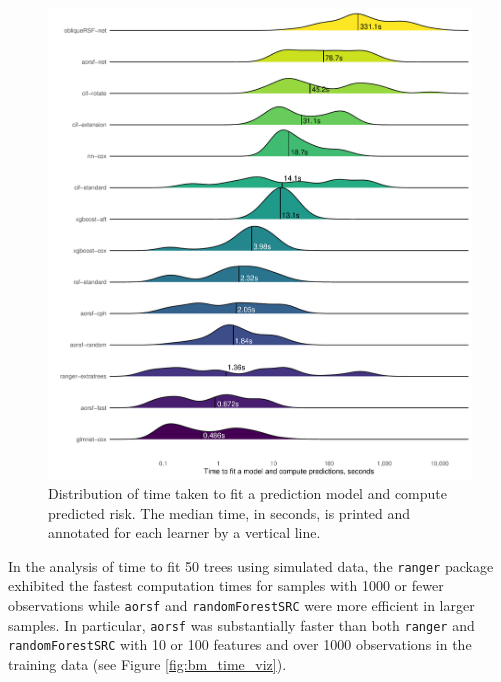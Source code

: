 \documentclass[twoside,11pt]{article}\usepackage[]{graphicx}\usepackage[]{xcolor}
\makeatletter
\def\maxwidth{ %
  \ifdim\Gin@nat@width>\linewidth
    \linewidth
  \else
    \Gin@nat@width
  \fi
}
\newenvironment{knitrout}{}{} %
\makeatother
\begin{document}
\begin{knitrout}
\color{fgcolor}\begin{figure}
\includegraphics[width=\maxwidth]{figure/bm_pred_time-1} \caption[Distribution of time taken to fit a prediction model and compute predicted risk]{Distribution of time taken to fit a prediction model and compute predicted risk. The median time, in seconds, is printed and annotated for each learner by a vertical line.}\label{fig:bm_pred_time}
\end{figure}

\end{knitrout}

In the analysis of time to fit 50 trees using simulated data, the \texttt{ranger} package exhibited the fastest computation times for samples with 1000 or fewer observations while \texttt{aorsf} and \texttt{randomForestSRC} were more efficient in larger samples. In particular, \texttt{aorsf} was substantially faster than both \texttt{ranger} and \texttt{randomForestSRC} with 10 or 100 features and over 1000 observations in the training data (see Figure \ref{fig:bm_time_viz}).
\end{document}
